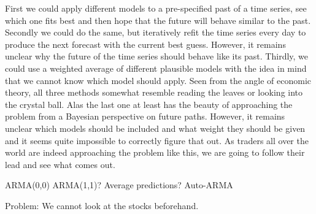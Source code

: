 First we could apply different models to a pre-specified past of a time series, see which one fits best and then hope that the future will behave similar to the past. Secondly we could do the same, but iteratively refit the time series every day to produce the next forecast with the current best guess. However, it remains unclear why the future of the time series should behave like its past. Thirdly, we could use a weighted average of different plausible models with the idea in mind that we cannot know which model should apply. Seen from the angle of economic theory, all three methods somewhat resemble reading the leaves or looking into the crystal ball. Alas the last one at least has the beauty of approaching the problem from a Bayesian perspective on future paths. However, it remains unclear which models should be included and what weight they should be given and it seems quite impossible to correctly figure that out. As traders all over the world are indeed approaching the problem like this, we are going to follow their lead and see what comes out. 

ARMA(0,0)
ARMA(1,1)? 
Average predictions?
Auto-ARMA


Problem: We cannot look at the stocks beforehand. 







